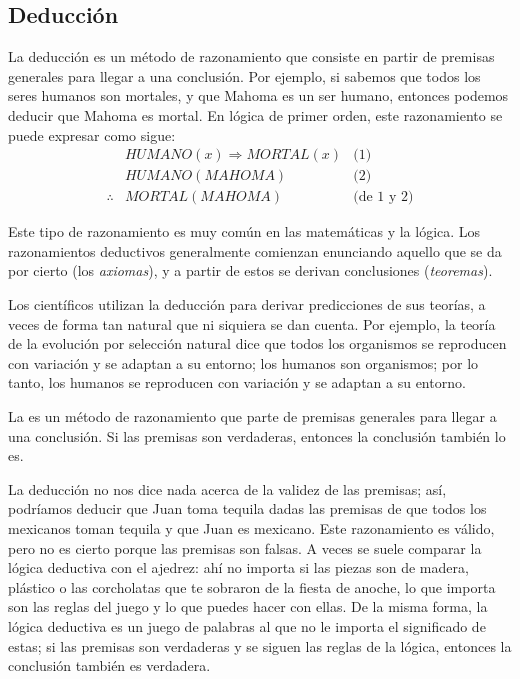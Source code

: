 \subsection*{Deducción}
\label{sub:deduccion}
La deducción es un método de razonamiento que consiste en partir de premisas
generales para llegar a una conclusión.
Por ejemplo, si sabemos que todos los seres humanos son mortales, y que Mahoma
es un ser humano, entonces podemos deducir que Mahoma es mortal.
En lógica de primer orden, este razonamiento se puede expresar como sigue:
\begin{align*}
               & \mathit{HUMANO}(x) \Rightarrow \mathit{MORTAL}(x) & \text{(1)}        \\
               & \mathit{HUMANO}(\mathit{MAHOMA})                  & \text{(2)}        \\
    \hline
    \therefore & \mathit{MORTAL}(\mathit{MAHOMA})                  & \text{(de 1 y 2)}
\end{align*}

Este tipo de razonamiento es muy común en las matemáticas y la lógica.
Los razonamientos deductivos generalmente comienzan enunciando aquello que se da
por cierto (los \emph{axiomas}), y a partir de estos se derivan conclusiones
(\emph{teoremas}).

Los científicos utilizan la deducción para derivar predicciones de sus teorías,
a veces de forma tan natural que ni siquiera se dan cuenta.
Por ejemplo, la teoría de la evolución por selección natural dice que todos los
organismos se reproducen con variación y se adaptan a su entorno; los humanos
son organismos; por lo tanto, los humanos se reproducen con variación y se
adaptan a su entorno.

\begin{remember}
    \label{rem:deduccion}
    La  es un método de razonamiento que parte de
    premisas generales para llegar a una conclusión.
    Si las premisas son verdaderas, entonces la conclusión también lo es.
\end{remember}

La deducción no nos dice nada acerca de la validez de las premisas; así,
podríamos deducir que Juan toma tequila dadas las premisas de que todos los
mexicanos toman tequila y que Juan es mexicano.
Este razonamiento es válido, pero no es cierto porque las premisas son falsas.
A veces se suele comparar la lógica deductiva con el ajedrez: ahí no importa si
las piezas son de madera, plástico o las corcholatas que te sobraron de la
fiesta de anoche, lo que importa son las reglas del juego y lo que puedes
hacer con ellas.
De la misma forma, la lógica deductiva es un juego de palabras al que no le
importa el significado de estas; si las premisas son verdaderas y se siguen las
reglas de la lógica, entonces la conclusión también es verdadera.

